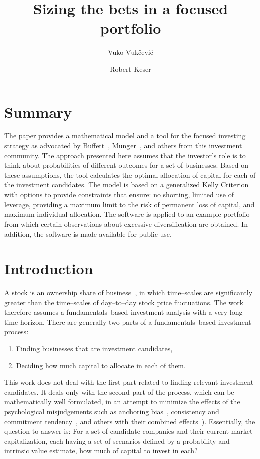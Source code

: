 \documentclass{article}
\title{Sizing the bets in a focused portfolio}
\author[$\dagger$]{Vuko Vuk\v{c}evi\'{c}}
\author[$\dagger$]{Robert Keser}
\affil[$\dagger$]{In silico Ltd., Zagreb, Croatia,\linebreak vuko.vukcevic@insilico.hr, robert.keser@insilico.hr}
\begin{document}
\maketitle

\section{Summary}
\label{sec:summary}

The paper provides a mathematical model and a tool for the focused
investing strategy as advocated by Buffett~\cite{berkshireLetters},
Munger~\cite{almanack}, and others from this investment community.
The approach presented here assumes that the investor's role is to think about
probabilities of different outcomes for a set of businesses. Based on these
assumptions, the tool calculates the optimal allocation of capital for
each of the investment candidates. The model is based on a generalized Kelly
Criterion with options to provide constraints that ensure: no shorting, limited
use of leverage, providing a maximum limit to the risk of permanent loss of
capital, and maximum individual allocation. The software is applied to an
example portfolio from which certain observations about excessive
diversification are obtained. In addition, the software is made available for
public use.\\

\section{Introduction}
\label{sec:introduction}

A stock is an ownership share of business~\cite{intelligentInvestor}, in
which time--scales are significantly greater than the time--scales of
day--to--day stock price fluctuations. The work therefore assumes a
fundamentals--based investment analysis with a very long time horizon. There are
generally two parts of a fundamentals--based investment process:
\begin{enumerate}
    \item Finding businesses that are investment candidates,
    \item Deciding how much capital to allocate in each of them.
\end{enumerate}

\noindent This work does not deal with the first part related to finding
relevant investment candidates. It deals only with the second part of the
process, which can be mathematically well formulated, in an attempt to minimize
the effects of the psychological misjudgements such as anchoring
bias~\cite{kahneman}, consistency and commitment tendency~\cite{cialdini}, and
others with their combined effects~\cite{almanack}). Essentially, the question
to answer is: For a set of candidate companies and their current market
capitalization, each having a set of scenarios defined by a probability and
intrinsic value estimate, how much of capital to invest in each?\\
\end{document}
